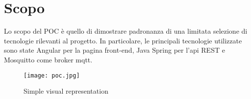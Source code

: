 \chapter{Scopo}\label{scopo}

Lo scopo del POC è quello di dimostrare padronanza di una limitata selezione di tecnologie rilevanti al progetto. In particolare, le principali tecnologie utilizzate sono state Angular per la pagina front-end, Java Spring per l'api REST e Mosquitto come broker mqtt.

\begin{figure}
    \texttt{[image: poc.jpg]}
    \caption{Simple visual representation}
\end{figure}